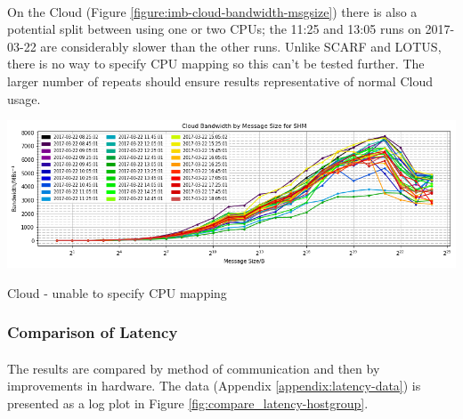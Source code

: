 \documentclass{article}
\begin{document}
            \paragraph{} On the Cloud (Figure \ref{figure:imb-cloud-bandwidth-msgsize}) there is also a potential split between using one or two CPUs; the 11:25 and 13:05 runs on 2017-03-22 are considerably slower than the other runs. Unlike SCARF and LOTUS, there is no way to specify CPU mapping so this can't be tested further. The larger number of repeats should ensure results representative of normal Cloud usage.
            \begin{center}
                \includegraphics[width=\textwidth]{cloud_bandwidth-msgsize_shm}
                \captionsetup{type=figure}
                \caption{Cloud - unable to specify CPU mapping}
                \label{figure:imb-cloud-bandwidth-msgsize}
            \end{center}

        \subsubsection{Comparison of Latency}
            \label{analyse-results-imb-latency}

            \paragraph{}
            The results are compared by method of communication and then by improvements in hardware. The data (Appendix \ref{appendix:latency-data}) is presented as a log plot in Figure \ref{fig:compare_latency-hostgroup}.
\end{document}
